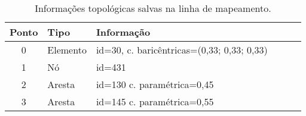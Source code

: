 
\begin{table} [hbt!]
 \begin{center}
	 \caption{Informações topológicas salvas na linha de mapeamento.\label{tab-lm-topo}}
	~\\[-2mm]
	 \begin{tabularx}
		 {\textwidth}
		 {cp{2.0cm} lp{3.0cm} lp{10.0cm}}

		 \textbf{Ponto}
		 & \textbf{Tipo}
		 & \textbf{Informação} \\ \toprule

		 0
		 & Elemento
		 & id=30, c. baricêntricas=(0,33; 0,33; 0,33) \\ \midrule

		 1
		 & Nó   
		 & id=431 \\ \midrule

		 2
		 & Aresta
		 & id=130 c. paramétrica=0,45 \\ \midrule

		 3
		 & Aresta
		 & id=145 c. paramétrica=0,55 \\ \midrule

	 \end{tabularx}
 \end{center}
\end{table}

